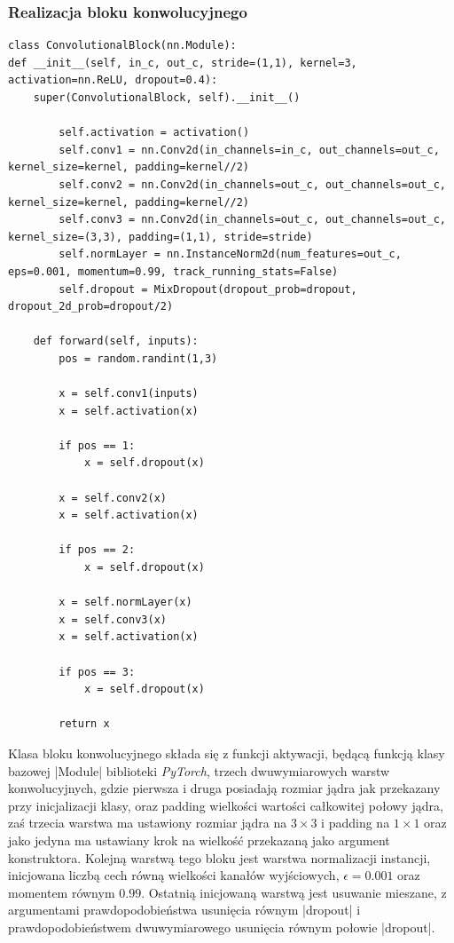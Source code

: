 \subsubsection{Realizacja bloku konwolucyjnego} \label{ConvBlock}
\begin{lstlisting}[caption={\pyth|ConvolutionalBlock| - klasa bloku konwolucyjnego}, label={convblock}]
class ConvolutionalBlock(nn.Module):
def __init__(self, in_c, out_c, stride=(1,1), kernel=3, activation=nn.ReLU, dropout=0.4):
	super(ConvolutionalBlock, self).__init__()
	
		self.activation = activation()
		self.conv1 = nn.Conv2d(in_channels=in_c, out_channels=out_c, kernel_size=kernel, padding=kernel//2)
		self.conv2 = nn.Conv2d(in_channels=out_c, out_channels=out_c, kernel_size=kernel, padding=kernel//2)
		self.conv3 = nn.Conv2d(in_channels=out_c, out_channels=out_c, kernel_size=(3,3), padding=(1,1), stride=stride)
		self.normLayer = nn.InstanceNorm2d(num_features=out_c, eps=0.001, momentum=0.99, track_running_stats=False)
		self.dropout = MixDropout(dropout_prob=dropout, dropout_2d_prob=dropout/2)
	
	def forward(self, inputs):
		pos = random.randint(1,3)
		
		x = self.conv1(inputs)
		x = self.activation(x)
		
		if pos == 1:
			x = self.dropout(x)
		
		x = self.conv2(x)
		x = self.activation(x)
		
		if pos == 2:
			x = self.dropout(x)
		
		x = self.normLayer(x)
		x = self.conv3(x)
		x = self.activation(x)
		
		if pos == 3:
			x = self.dropout(x)
		
		return x
\end{lstlisting}

Klasa bloku konwolucyjnego składa się z funkcji aktywacji, będącą funkcją klasy bazowej \pyth|Module| biblioteki \textit{PyTorch}, trzech dwuwymiarowych warstw konwolucyjnych, gdzie pierwsza i druga posiadają rozmiar jądra jak przekazany przy inicjalizacji klasy, oraz padding wielkości wartości całkowitej połowy jądra, zaś trzecia warstwa ma ustawiony rozmiar jądra na $3\times 3$ i padding na $1 \times 1$ oraz jako jedyna ma ustawiany krok na wielkość przekazaną jako argument konstruktora. Kolejną warstwą tego bloku jest warstwa normalizacji instancji, inicjowana liczbą cech równą wielkości kanałów wyjściowych, $\epsilon = 0.001$ oraz momentem równym $0.99$. Ostatnią inicjowaną warstwą jest usuwanie mieszane, z argumentami prawdopodobieństwa usunięcia równym \pyth|dropout| i prawdopodobieństwem dwuwymiarowego usunięcia równym połowie \pyth|dropout|.

